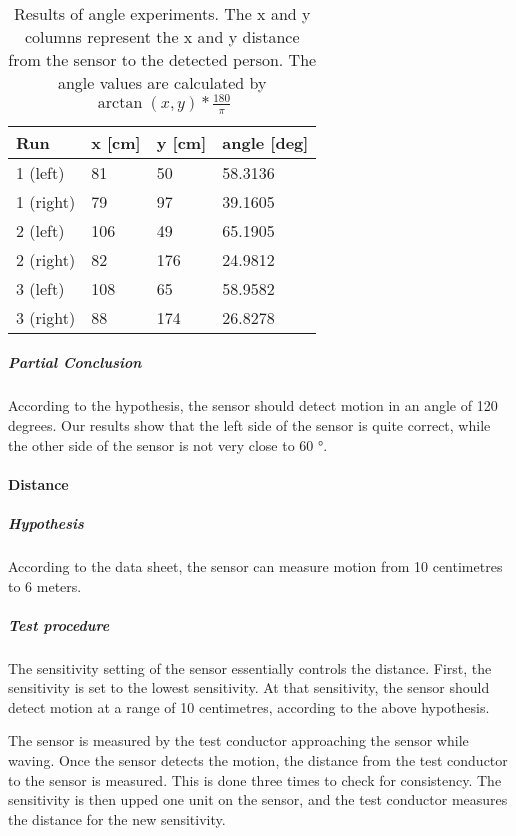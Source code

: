 \begin{table}[htbp]
\centering
\begin{tabular}{@{}llll@{}}
\toprule
Run & x [cm] & y [cm] & angle [deg] \\ \midrule
1 (left) & 81 & 50 & 58.3136 \\
1 (right) & 79 & 97 & 39.1605  \\ \midrule
2 (left) & 106 & 49 & 65.1905 \\
2 (right) & 82 & 176 & 24.9812 \\ \midrule
3 (left) & 108 & 65 & 58.9582 \\
3 (right) & 88 & 174 & 26.8278 \\ \bottomrule
\end{tabular}
\caption[Angle experiment results]{Results of angle experiments. The x and y columns represent the x and y
  distance from the sensor to the detected person. The angle values are
  calculated by $\arctan (x,y) * \frac{180}{\pi}$}
\label{tab:pir_angle}
\end{table}

\subparagraph{Partial Conclusion}
\label{subp:AngPartial_conclusion}

According to the hypothesis, the sensor should detect motion in an angle of 120 degrees. Our results show that the left side of the sensor is quite correct, while the other side of the sensor is not very close to 60 $\si{\degree}$.

\paragraph{Distance}

\subparagraph{Hypothesis}

According to the data sheet, the sensor can measure motion from 10 centimetres to
6 meters.

\subparagraph{Test procedure}

The sensitivity setting of the sensor essentially controls the distance. First,
the sensitivity is set to the lowest sensitivity. At that sensitivity, the
sensor should detect motion at a range of 10 centimetres, according to the above
hypothesis.

The sensor is measured by the test conductor approaching the sensor while
waving. Once the sensor detects the motion, the distance from the test conductor
to the sensor is measured. This is done three times to check for consistency. The sensitivity is then upped one unit on the sensor,
and the test conductor measures the distance for the new sensitivity.

